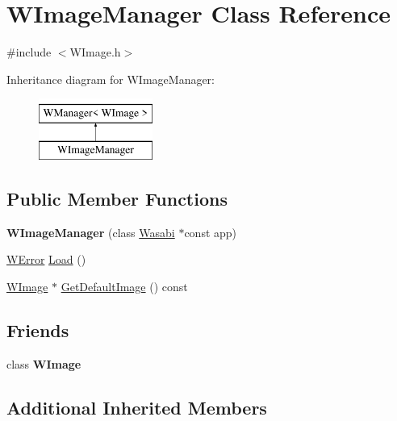 \hypertarget{class_w_image_manager}{}\section{W\+Image\+Manager Class Reference}
\label{class_w_image_manager}


{\ttfamily \#include $<$W\+Image.\+h$>$}

Inheritance diagram for W\+Image\+Manager\+:\begin{figure}[H]
\begin{center}
\leavevmode
\includegraphics[height=2.000000cm]{class_w_image_manager}
\end{center}
\end{figure}
\subsection*{Public Member Functions}
\begin{DoxyCompactItemize}
\item 
{\bfseries W\+Image\+Manager} (class \hyperlink{class_wasabi}{Wasabi} $\ast$const app)\hypertarget{class_w_image_manager_a84f30345e1eb50fd87b97bedb70c30cd}{}\label{class_w_image_manager_a84f30345e1eb50fd87b97bedb70c30cd}

\item 
\hyperlink{class_w_error}{W\+Error} \hyperlink{class_w_image_manager_a17b586e0a331eac86e2fd30fbb87b6ef}{Load} ()
\item 
\hyperlink{class_w_image}{W\+Image} $\ast$ \hyperlink{class_w_image_manager_a55a7d3a15d6fbc45aa55c1ab8b8f981c}{Get\+Default\+Image} () const 
\end{DoxyCompactItemize}
\subsection*{Friends}
\begin{DoxyCompactItemize}
\item 
class {\bfseries W\+Image}\hypertarget{class_w_image_manager_aa77a86e6a7dfbf4ba224885b036344e5}{}\label{class_w_image_manager_aa77a86e6a7dfbf4ba224885b036344e5}

\end{DoxyCompactItemize}
\subsection*{Additional Inherited Members}


